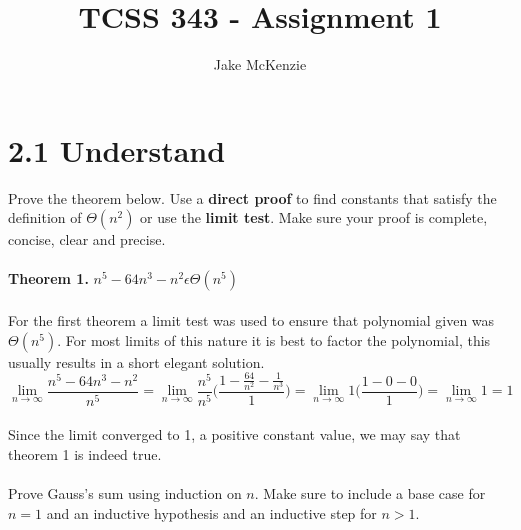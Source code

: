\documentclass[12pt]{article}
\begin{document}
\title{TCSS 343 - Assignment 1}
\author{Jake McKenzie}
\maketitle


\section{2.1 Understand}

Prove the theorem below. 
Use a \textbf{direct proof} to find constants that satisfy the definition of \begin{math}\Theta(n^2)\end{math} or use the \textbf{limit test}.  
Make sure your proof is complete, concise, clear and precise.
\\\\\textbf{Theorem 1.} 
\begin{math}n^5-64n^3-n^2 \epsilon \Theta(n^5)\end{math}
\\\\For the first theorem a limit test was used to ensure that polynomial given was \begin{math}\Theta(n^5)\end{math}. For most limits of 
this nature it is best to factor the polynomial, this usually results in a short elegant solution. 
\[ \lim_{n \to \infty}  \frac{n^5-64n^3-n^2}{n^5} = \lim_{n \to \infty} \frac{n^5}{n^5}\Bigg(\frac{1-\frac{64}{n^2}-\frac{1}{n^3}}{1}\Bigg) = \lim_{n \to \infty} 1\Bigg(\frac{1-0-0}{1}\Bigg) = \lim_{n \to \infty} 1 = 1\]
\\Since the limit converged to 1, a positive constant value, we may say that theorem 1 is indeed true.\\\\
\noindent Prove Gauss’s sum using induction on \begin{math}n\end{math}. Make sure to include a base case for \begin{math} n = 1\end{math} and an inductive hypothesis and an inductive step for \begin{math}n > 1\end{math}.\\
\end{document}
